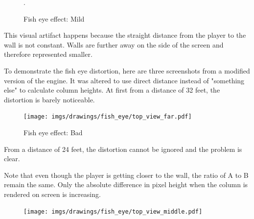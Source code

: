 \begin{minipage}{\textwidth}

    \begin{figure}[H]
    \centering
     \caption{Fish eye effect: Mild}. \label{fig:mips}
     \end{figure} 


    \begin{minipage}{.4\textwidth}
    This visual artifact happens because the straight distance from the player to the wall is not constant. Walls are further away on the side of the screen and therefore represented smaller.\\
    \par
    To demonstrate the fish eye distortion, here are three screenshots from a modified version of the engine. It was altered to use direct distance  instead of "something else" to calculate column heights. At first from a distance of 32 feet, the distortion is barely noticeable.\\
     \end{minipage}
    \begin{minipage}{.6\textwidth}
    \begin{figure}[H]
      \begin{flushright}
     \texttt{[image: imgs/drawings/fish\_eye/top\_view\_far.pdf]}
       \end{flushright}
    \end{figure}
    \end{minipage}
\end{minipage}
\par



\begin{minipage}{\textwidth}
\begin{figure}[H]
\centering
 \caption{Fish eye effect: Bad} \label{fig:mips}
 \end{figure}
\begin{minipage}{.4\textwidth}
From a distance of 24 feet, the distortion cannot be ignored and the problem is clear.\\
\par
Note that even though the player is getting closer to the wall, the ratio of A to B remain the same. Only the absolute difference in pixel height when the column is rendered on screen is increasing.
 \end{minipage}
\begin{minipage}{.6\textwidth}
\begin{figure}[H]
  \begin{flushright}
 \texttt{[image: imgs/drawings/fish\_eye/top\_view\_middle.pdf]}
 \end{flushright}
\end{figure}
\end{minipage}
\end{minipage}




